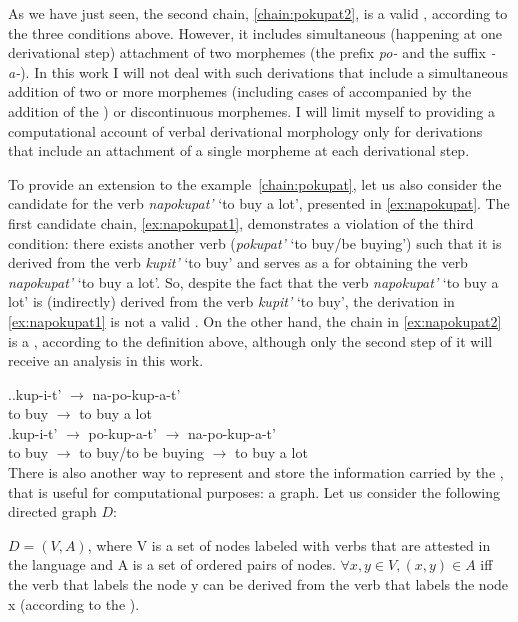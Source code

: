 As we have just seen, the second chain, \ref{chain:pokupat2}, is a valid , according to the three conditions above. However, it includes simultaneous (happening at one derivational step) attachment of two morphemes (the prefix \textit{po-} and the suffix \textit{-a-}). In this work I will not deal with such derivations that include a simultaneous addition of two or more morphemes (including cases of  accompanied by the addition of the ) or discontinuous morphemes. I will limit myself to providing a computational account of verbal derivational morphology only for derivations that include an attachment of a single morpheme at each derivational step.

To provide an extension to the example~\ref{chain:pokupat}, let us also consider the candidate  for the verb \textit{napokupat'} `to buy a lot', presented in \ref{ex:napokupat}. The first candidate chain, \ref{ex:napokupat1}, demonstrates a violation of the third condition: there exists another verb (\textit{pokupat'} `to buy/be buying') such that it is derived from the verb \textit{kupit'} `to buy' and serves as a  for obtaining the verb \textit{napokupat'} `to buy a lot'. So, despite the fact that the verb \textit{napokupat'} `to buy a lot' is (indirectly) derived from the verb \textit{kupit'} `to buy', the derivation in \ref{ex:napokupat1} is not a valid . On the other hand, the chain in \ref{ex:napokupat2} is a , according to the definition above, although only the second step of it will receive an analysis in this work. 

\ex.\label{ex:napokupat}\ag.\label{ex:napokupat1}kup-i-t'\textsuperscript{\PF} $\rightarrow$ na-po-kup-a-t'\textsuperscript{\PF}\\	
{to buy} $\rightarrow$ {to buy a lot}\\
\bg.\label{ex:napokupat2}kup-i-t'\textsuperscript{\PF} $\rightarrow$ po-kup-a-t'\textsuperscript{\IPF} $\rightarrow$ na-po-kup-a-t'\textsuperscript{\PF}\\
{to buy} $\rightarrow$ {to buy/to be buying} $\rightarrow$ {to buy a lot}\\

There is also another way to represent and store the information carried by the , that is useful for computational purposes: a graph. Let us consider the following directed graph $D$: 
\begin{definition}\label{def:chain}
$D = (V,A)$, where V is a set of nodes labeled with verbs that are attested in the language and A is a set of ordered pairs of nodes. $\forall x,y \in V, (x,y) \in A$ iff  the verb that labels the node y can be derived from the verb that labels the node x (according to the ).
\end{definition}

